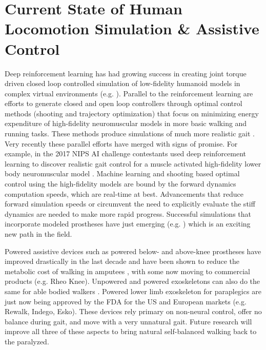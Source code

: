 \documentclass[letter]{article}
\begin{document}
\section{Current State of Human Locomotion Simulation \& Assistive Control%
  \label{current-state-of-human-locomotion-simulation-assistive-control}%
}

Deep reinforcement learning has had growing success in creating joint torque
driven closed loop controlled simulation of low-fidelity humanoid models in
complex virtual environments (e.g. \cite{Tan2014,Heess2017}). Parallel to the
reinforcement learning are efforts to generate closed and open loop controllers
through optimal control methods (shooting and trajectory optimization) that
focus on minimizing energy expenditure of high-fidelity neuromuscular models in
more basic walking and running tasks. These methods produce simulations of much
more realistic gait \cite{Ackermann2010,vandenBogert2011,Wang2012,Geijtenbeek2013,Mordatch2013,Uchida2016,Dembia2017}. Very recently
these parallel efforts have merged with signs of promise. For example, in the
2017 NIPS AI challenge contestants used deep reinforcement learning to discover
realistic gait control for a muscle activated high-fidelity lower body
neuromuscular model \cite{Kidzinski2017}. Machine learning and shooting based
optimal control using the high-fidelity models are bound by the forward
dynamics computation speeds, which are real-time at best. Advancements that
reduce forward simulation speeds or circumvent the need to explicitly evaluate
the stiff dynamics are needed to make more rapid progress. Successful
simulations that incorporate modeled prostheses have just emerging (e.g.
\cite{Koelewijn2016}) which is an exciting new path in the field.

Powered assistive devices such as powered below- and above-knee prostheses have
improved drastically in the last decade and have been shown to reduce the
metabolic cost of walking in amputees \cite{Au2009}, with some now moving to
commercial products (e.g. Rheo Knee). Unpowered \cite{Collins2015} and powered
\cite{Zhang2017} exoskeletons can also do the same for able bodied walkers
\cite{Collins2015}. Powered lower limb exoskeleton for paraplegics are just now
being approved by the FDA for the US and European markets (e.g. Rewalk, Indego,
Esko). These devices rely primary on non-neural control, offer no balance
during gait, and move with a very unnatural gait. Future research will improve
all three of these aspects to bring natural self-balanced walking back to the
paralyzed.
\end{document}
